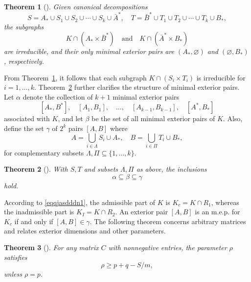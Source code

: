 \documentclass{article}
\newtheorem{theorem}{Theorem}[section]
\theoremstyle{definition}
\begin{document}
\begin{theorem}[\cite{Mendelsohn58Dulmage}]\label{thm3covering}
Given canonical decompositions
\[
S = A_* \cup S_1 \cup S_2 \cup \cdots \cup S_k \cup \bar{A}^*, \quad T = \bar{B}^* \cup T_1 \cup T_2 \cup \cdots \cup T_k \cup B_*,
\]
the subgraphs
\[
K \cap (A_* \times \bar{B}^*) \quad \text{and} \quad K \cap (\bar{A}^* \times B_*)
\]
are irreducible, and their only minimal exterior pairs are $(A_*, \varnothing)$ and $(\varnothing, B_*)$, respectively.
\end{theorem}

From Theorem~\ref{thm3covering}, it follows that each subgraph $K \cap (S_i \times T_i)$ is irreducible for $i = 1, \ldots, k$. Theorem~\ref{thm4covering} further clarifies the structure of minimal exterior pairs. Let $\alpha$ denote the collection of $k+1$ minimal exterior pairs
\[
[A_*, B^{*}], \quad [A_1, B_1], \quad \ldots, \quad [A_{k-1}, B_{k-1}], \quad [A^{*}, B_*]
\]
associated with $K$, and let $\beta$ be the set of all minimal exterior pairs of $K$. Also, define the set $\gamma$ of $2^{k}$ pairs $[A,B]$ where
\begin{equation}\label{eqqjasdddn1}
A = \bigcup_{i \in \Lambda} S_i \cup A_*, \quad B = \bigcup_{i \in \Pi} T_i \cup B_*,
\end{equation}
for complementary subsets $\Lambda, \Pi \subseteq \{1, \ldots, k\}$.

\begin{theorem}[\cite{Mendelsohn58Dulmage}]\label{thm4covering}
With $S, T$ and subsets $\Lambda, \Pi$ as above, the inclusions
\[
\alpha \subseteq \beta \subseteq \gamma
\]
hold.
\end{theorem}

According to \eqref{eqqjasdddn1}, the admissible part of $K$ is $K_c = K \cap R_1$, whereas the inadmissible part is $K_I = K \cap R_2$. An exterior pair $[A,B]$ is an m.e.p. for $K_c$ if and only if $[A,B] \in \gamma$. The following theorem concerns arbitrary matrices and relates exterior dimensions and other parameters.

\begin{theorem}[\cite{Mendelsohn58Dulmage}]\label{thm5covering}
For any matrix $C$ with nonnegative entries, the parameter $\rho$ satisfies
\[
\rho \ge p + q - S/m,
\]
unless $\rho = p$.
\end{theorem}


\end{document}

